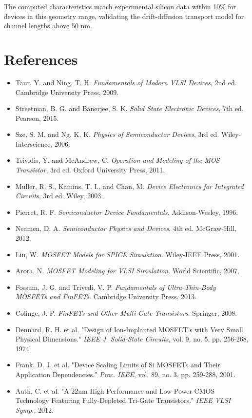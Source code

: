 \documentclass[a4paper, 11pt]{article}
\begin{document}
The computed characteristics match experimental silicon data within 10\% for devices in this geometry range, validating the drift-diffusion transport model for channel lengths above 50 nm.

\section*{References}

\begin{itemize}
\item Taur, Y. and Ning, T. H. \textit{Fundamentals of Modern VLSI Devices}, 2nd ed. Cambridge University Press, 2009.
\item Streetman, B. G. and Banerjee, S. K. \textit{Solid State Electronic Devices}, 7th ed. Pearson, 2015.
\item Sze, S. M. and Ng, K. K. \textit{Physics of Semiconductor Devices}, 3rd ed. Wiley-Interscience, 2006.
\item Tsividis, Y. and McAndrew, C. \textit{Operation and Modeling of the MOS Transistor}, 3rd ed. Oxford University Press, 2011.
\item Muller, R. S., Kamins, T. I., and Chan, M. \textit{Device Electronics for Integrated Circuits}, 3rd ed. Wiley, 2003.
\item Pierret, R. F. \textit{Semiconductor Device Fundamentals}. Addison-Wesley, 1996.
\item Neamen, D. A. \textit{Semiconductor Physics and Devices}, 4th ed. McGraw-Hill, 2012.
\item Liu, W. \textit{MOSFET Models for SPICE Simulation}. Wiley-IEEE Press, 2001.
\item Arora, N. \textit{MOSFET Modeling for VLSI Simulation}. World Scientific, 2007.
\item Fossum, J. G. and Trivedi, V. P. \textit{Fundamentals of Ultra-Thin-Body MOSFETs and FinFETs}. Cambridge University Press, 2013.
\item Colinge, J.-P. \textit{FinFETs and Other Multi-Gate Transistors}. Springer, 2008.
\item Dennard, R. H. et al. "Design of Ion-Implanted MOSFET's with Very Small Physical Dimensions." \textit{IEEE J. Solid-State Circuits}, vol. 9, no. 5, pp. 256-268, 1974.
\item Frank, D. J. et al. "Device Scaling Limits of Si MOSFETs and Their Application Dependencies." \textit{Proc. IEEE}, vol. 89, no. 3, pp. 259-288, 2001.
\item Auth, C. et al. "A 22nm High Performance and Low-Power CMOS Technology Featuring Fully-Depleted Tri-Gate Transistors." \textit{IEEE VLSI Symp.}, 2012.

\end{itemize}
\end{document}
